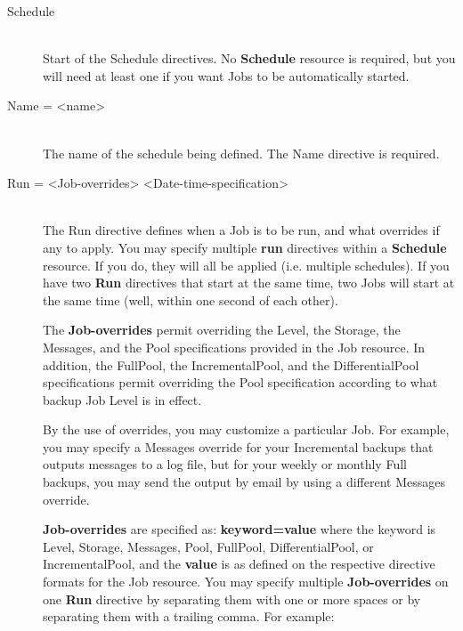 \begin{description}

\item [Schedule] \hfill \\
Start of the Schedule directives.  No {\bf Schedule} resource is
required, but you will need at least one if you want Jobs to be
automatically started.

\item [Name = {\textless}name{\textgreater}] \hfill \\
The name of the schedule being defined.  The Name directive is required.

\item [Run = {\textless}Job-overrides{\textgreater} {\textless}Date-time-specification{\textgreater}] \hfill \\
The Run directive defines when a Job is to be run, and what overrides if
any to apply.  You may specify multiple {\bf run} directives within a
{\bf Schedule} resource.  If you do, they will all be applied (i.e.
multiple schedules).  If you have two {\bf Run} directives that start at
the same time, two Jobs will start at the same time (well, within one
second of each other).

The {\bf Job-overrides} permit overriding the Level, the Storage, the
Messages, and the Pool specifications provided in the Job resource.  In
addition, the FullPool, the IncrementalPool, and the DifferentialPool
specifications permit overriding the Pool specification according to
what backup Job Level is in effect.

By the use of overrides, you may customize a particular Job.  For
example, you may specify a Messages override for your Incremental
backups that outputs messages to a log file, but for your weekly or
monthly Full backups, you may send the output by email by using a
different Messages override.

{\bf Job-overrides} are specified as: {\bf keyword=value} where the
keyword is Level, Storage, Messages, Pool, FullPool, DifferentialPool,
or IncrementalPool, and the {\bf value} is as defined on the respective
directive formats for the Job resource.  You may specify multiple {\bf
Job-overrides} on one {\bf Run} directive by separating them with one or
more spaces or by separating them with a trailing comma.  For example:

\begin{description}


\end{description}
\end{description}
